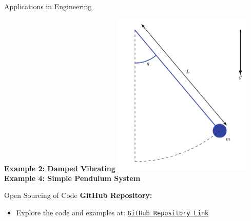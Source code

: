 \documentclass[10pt, aspectratio=54]{beamer}
\begin{document}
\begin{frame}{Applications in Engineering}
\begin{minipage}[t]{0.48\textwidth}
		\vspace{0.2cm}
		\textbf{Example 2: Damped Vibrating}
		\vspace{0.3cm}
		\includegraphics[width=0.5\textwidth]{Figures/simple_pendulum_scheme.png} %
		\vspace{0.2cm}
		\textbf{Example 4: Simple Pendulum System}
	\end{minipage}
\end{frame}

\begin{frame}{Open Sourcing of Code}
	\justifying
	\textbf{GitHub Repository:}
	\begin{itemize}
		\item Explore the code and examples at: \href{https://github.com/pb96git/Numerical-Solutions-for-Partial-Differential-Equations/tree/main}{\texttt{GitHub Repository Link}}
	\end{itemize}
\end{frame}
\end{document}
